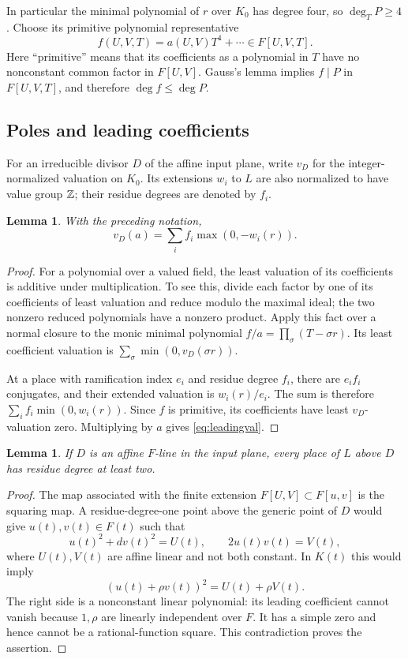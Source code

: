 \documentclass[11pt,a4paper]{article}
\newtheorem{lemma}[theorem]{Lemma}
\begin{document}
In particular the minimal polynomial of $r$ over $K_0$ has degree four,
so $\deg_TP\ge4$. Choose its primitive polynomial representative
\[
 f(U,V,T)=a(U,V)T^4+\cdots\in F[U,V,T].
\]
Here ``primitive'' means that its coefficients as a polynomial in $T$
have no nonconstant common factor in $F[U,V]$. Gauss's lemma implies
$f\mid P$ in $F[U,V,T]$, and therefore $\deg f\le\deg P$.

\subsection{Poles and leading coefficients}

For an irreducible divisor $D$ of the affine input plane, write $v_D$
for the integer-normalized valuation on $K_0$. Its extensions $w_i$
to $L$ are also normalized to have value group $\mathbb Z$; their residue
degrees are denoted by $f_i$.

\begin{lemma}\label{lem:gauss}
With the preceding notation,
\begin{equation}\label{eq:leadingval}
                    v_D(a)=\sum_i f_i\max(0,-w_i(r)).
\end{equation}
\end{lemma}
\begin{proof}
For a polynomial over a valued field, the least valuation of its
coefficients is additive under multiplication. To see this, divide
each factor by one of its coefficients of least valuation and reduce
modulo the maximal ideal; the two nonzero reduced polynomials have
a nonzero product. Apply this fact over a normal closure to the
monic minimal polynomial
$f/a=\prod_{\sigma}(T-\sigma r)$. Its least coefficient valuation is
$\sum_\sigma\min(0,v_D(\sigma r))$.

At a place with ramification index $e_i$ and residue degree $f_i$,
there are $e_if_i$ conjugates, and their extended valuation is
$w_i(r)/e_i$. The sum is therefore
$\sum_i f_i\min(0,w_i(r))$. Since $f$ is primitive, its coefficients
have least $v_D$-valuation zero. Multiplying by $a$ gives
\eqref{eq:leadingval}.
\end{proof}

\begin{lemma}\label{lem:line}
If $D$ is an affine $F$-line in the input plane, every place of $L$
above $D$ has residue degree at least two.
\end{lemma}
\begin{proof}
The map associated with the finite extension
$F[U,V]\subset F[u,v]$ is the squaring map. A residue-degree-one
point above the generic point of $D$ would give $u(t),v(t)\in F(t)$
such that
\[
 u(t)^2+dv(t)^2=U(t),\qquad 2u(t)v(t)=V(t),
\]
where $U(t),V(t)$ are affine linear and not both constant.
In $K(t)$ this would imply
\[
                  (u(t)+\rho v(t))^2=U(t)+\rho V(t).
\]
The right side is a nonconstant linear polynomial: its leading
coefficient cannot vanish because $1,\rho$ are linearly independent
over $F$. It has a simple zero and hence cannot be a rational-function
square. This contradiction proves the assertion.
\end{proof}
\end{document}
